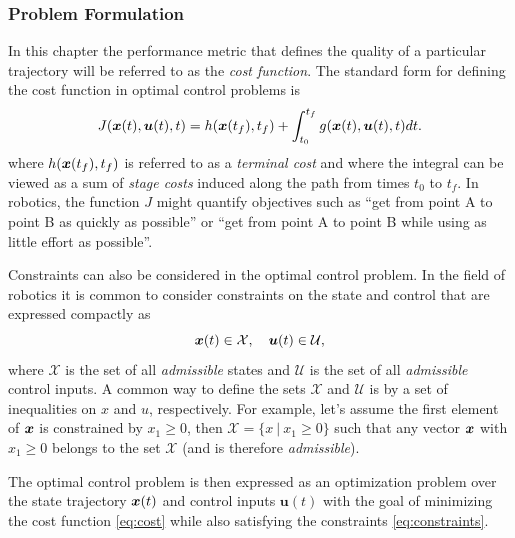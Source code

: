 \subsubsection{Problem Formulation}
In this chapter the performance metric that defines the quality of a particular trajectory will be referred to as the \textit{cost function}. The standard form for defining the cost function in optimal control problems is
\begin{equation} \label{eq:cost}
J(\bm{x}(t), \bm{u}(t), t) = h(\bm{x}(t_f),t_f) + \int_{t_0}^{t_f} g(\bm{x}(t),\bm{u}(t),t) dt.
\end{equation}
where $h(\bm{x}(t_f),t_f)$ is referred to as a \textit{terminal cost} and where the integral can be viewed as a sum of \textit{stage costs} induced along the path from times $t_0$ to $t_f$.
In robotics, the function $J$ might quantify objectives such as ``get from point A to point B as quickly as possible” or “get from point A to point B while using as little effort as possible”. 

Constraints can also be considered in the optimal control problem. In the field of robotics it is common to consider constraints on the state and control that are expressed compactly as
\begin{equation} \label{eq:constraints}
\bm{x}(t) \in \mathcal{X}, \quad \bm{u}(t) \in \mathcal{U},
\end{equation}
where $\mathcal{X}$ is the set of all \textit{admissible} states and $\mathcal{U}$ is the set of all \textit{admissible} control inputs. A common way to define the sets $\mathcal{X}$ and $\mathcal{U}$ is by a set of inequalities on $x$ and $u$, respectively. For example, let's assume the first element of $\bm{x}$ is constrained by $x_1 \geq 0$, then $\mathcal{X} = \{x \:|\: x_1 \geq 0\}$ such that any vector $\bm{x}$ with $x_1 \geq 0$ belongs to the set $\mathcal{X}$ (and is therefore \textit{admissible}). 

The optimal control problem is then expressed as an optimization problem over the state trajectory $\bm{x}(t)$ and control inputs $\bm{u}(t)$ with the goal of minimizing the cost function \eqref{eq:cost} while also satisfying the constraints \eqref{eq:constraints}.

